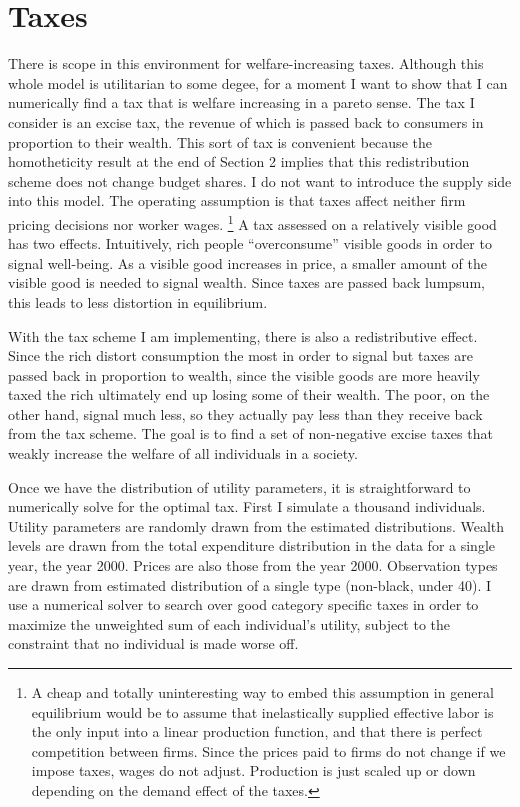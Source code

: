 \documentclass[12pt]{article}
\begin{document}
\section{Taxes}
There is scope in this environment for welfare-increasing taxes.  
Although this whole model is utilitarian to some degee, for a moment I want to show that I can numerically find a tax that is welfare increasing in a pareto sense.  
The tax I consider is an excise tax, the revenue of which is passed back to consumers in proportion to their wealth.
This sort of tax is convenient because the homotheticity result at the end of Section 2 implies that this redistribution scheme does not change budget shares.
I do not want to introduce the supply side into this model.
The operating assumption is that taxes affect neither firm pricing decisions nor worker wages.
\footnote{
    A cheap and totally uninteresting way to embed this assumption in general equilibrium would be to assume that inelastically supplied effective labor is the only input into a linear production function, and that there is perfect competition between firms.
    Since the prices paid to firms do not change if we impose taxes, wages do not adjust.
    Production is just scaled up or down depending on the demand effect of the taxes.
}
A tax assessed on a relatively visible good has two effects.
Intuitively, rich people ``overconsume'' visible goods in order to signal well-being.
As a visible good increases in price, a smaller amount of the visible good is needed to signal wealth.
Since taxes are passed back lumpsum, this leads to less distortion in equilibrium.

With the tax scheme I am implementing, there is also a redistributive effect.
Since the rich distort consumption the most in order to signal but taxes are passed back in proportion to wealth, since the visible goods are more heavily taxed the rich ultimately end up losing some of their wealth.
The poor, on the other hand, signal much less, so they actually pay less than they receive back from the tax scheme.  
The goal is to find a set of non-negative excise taxes that weakly increase the welfare of all individuals in a society.

Once we have the distribution of utility parameters, it is straightforward to numerically solve for the optimal tax.
First I simulate a thousand individuals.
Utility parameters are randomly drawn from the estimated distributions.
Wealth levels are drawn from the total expenditure distribution in the data for a single year, the year 2000.
Prices are also those from the year 2000.
Observation types are drawn from estimated distribution of a single type (non-black, under 40).
I use a numerical solver to search over good category specific taxes in order to maximize the unweighted sum of each individual's utility, subject to the constraint that no individual is made worse off.
\end{document}
